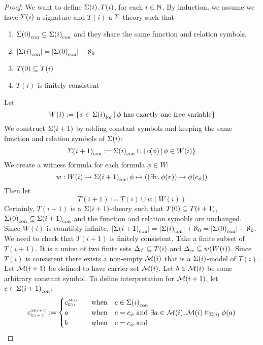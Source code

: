 \begin{proof}
    We want to define $\Sigma(i),T(i)$, 
    for each $i \in \mathbb{N}$.    
    By induction, 
    we assume we have $\Sigma(i)$ a signature and 
    $T(i)$ a $\Sigma$-theory such that 
    \begin{enumerate}
        \item ${\Sigma(0)}_\mathrm{con} \subseteq {\Sigma(i)}_\mathrm{con}$
        and they share the same function and relation symbols.
        \item $|{\Sigma(i)}_\mathrm{con}| = |{\Sigma(0)}_\mathrm{con}| + \aleph_0$
        \item $T(0) \subseteq T(i)$
        \item $T(i)$ is finitely consistent
    \end{enumerate}
    Let \[
        W(i) := \left\{\phi \in {\Sigma(i)}_\mathrm{for} 
        \,|\, \phi \text{ has exactly one free variable}\right\}\]
    We construct $\Sigma(i+1)$ 
    by adding constant symbols and 
    keeping the same function and relation symbols of $\Sigma(i)$:
    \[
        {\Sigma(i+1)}_\mathrm{con} :=
        {\Sigma(i)}_\mathrm{con} \cup \left\{c(\phi) 
        \,|\, \phi \in W(i)\right\}
    \]
    We create a witness formula for each formula $\phi \in W$:
    \[
        w : W(i) \to {\Sigma(i+1)}_\mathrm{for}, 
        \phi \mapsto ((\exists v, \phi(v)) \to \phi(c_\phi))\]
    Then let \[
        T(i+1) := 
        T(i) \cup w(W(i))
    \]
    Certainly, 
    $T(i+1)$ is a $\Sigma(i+1)$-theory such that $T(0) \subseteq T(i+1)$,
    ${\Sigma(0)}_\mathrm{con} \subseteq {\Sigma(i+1)}_\mathrm{con}$ 
    and the function and relation symobls are unchanged.
    Since $W(i)$ is countibly infinite, 
    $|{\Sigma(i+1)}_\mathrm{con}| = |{\Sigma(i)}_\mathrm{con}| + \aleph_0 = 
    |{\Sigma(0)}_\mathrm{con}| + \aleph_0 $.
    We need to check that $T(i+1)$ is finitely consistent.
    Take a finite subset of $T(i+1)$.
    It is a union of two finite sets 
    $\Delta_T \subseteq T(i)$ and $\Delta_w \subseteq w(W(i))$.
    Since $T(i)$ is consistent there exists a non-empty 
    $\mathcal{M}(i)$ that is a $\Sigma(i)$-model of $T(i)$.
    Let $\mathcal{M}(i+1)$ be defined to have carrier set ${\mathcal{M}(i)}$.
    Let $b \in {\mathcal{M}(i)}$ be some arbitrary constant symbol.
    To define interpretation for $\mathcal{M}(i+1)$, 
    let $c \in {\Sigma(i+1)}_\mathrm{con}$:
    \[
        \subintp{\Si(i+1)}{\MM(i+1)}{c} := 
        \begin{cases}
            \subintp{\Si(i)}{\MM(i)}{c} \quad &\text{when} \quad  
            c \in \const{\Si(i)} \\
            a \quad &\text{when} \quad c = c_\phi \text{ and } 
            \exists a \in {\MM(i)}, \MM(i) \model{\Si(i)} \phi(a)\\
            b \quad &\text{when} \quad c = c_\phi \text{ and } 

\end{cases}\]
\end{proof}
